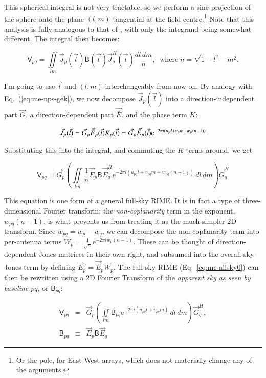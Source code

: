 \documentclass{aa}
\newcommand{\herm}{H}
\newcommand{\jones}[2]{\vec {#1}_{#2}}
\newcommand{\jonesT}[2]{\vec {#1}^{\herm}_{#2}}
\newcommand{\coh}[2]{\mathsf{{#1}}_{{#2}}}
\begin{document}
This spherical integral is not very tractable, so we perform a sine projection of the sphere onto the plane $(l,m)$ 
tangential at the field centre.\footnote{Or the pole, for East-West arrays, which does not materially change any of the arguments.} Note that this analysis is fully analogous to that of \citet[Sect.~3.1]{tms}, with only the integrand being somewhat different.  The integral then becomes:

\[
\coh{V}{pq} = \iint\limits_{lm} \jones{J}{p}(\vec l) \coh{B}{}(\vec l) \jonesT{J}{q}(\vec l) \frac{dl\,dm}{n},
\;\;\mathrm{where}\; n=\sqrt{1-l^2-m^2}.
\]

I'm going to use $\vec l$ and $(l,m)$ interchangeably from now on. By analogy with Eq.~(\ref{eq:me-nps-gek}), we now decompose $\jones{J}{p}(\vec l)$ into a direction-independent part $\jones{G}{}$, a direction-dependent part $\jones{\bar E}{}$, and the phase term $K$:

\[
\jones{J}{p}(\vec l) = \jones{G}{p}\jones{\bar E}{p}(\vec l) K_p(\vec l) = \jones{G}{p}\jones{\bar E}{p}(\vec l) {\rm e}^{-2\pi i(u_p l+v_p m+w_p (n-1))}
\]

Substituting this into the integral, and commuting the $K$ terms around, we get

\begin{equation}\label{eq:me-allsky0}
\coh{V}{pq} = \jones{G}{p} \left( \iint\limits_{lm} \frac{1}{n} \jones{\bar E}{p} \coh{B}{} \jonesT{\bar E}{q} \mathrm{e} ^{-2\pi i(u_{pq} l+v_{pq} m+w_{pq} (n-1))} \,dl\,dm \right) \jonesT{G}{q}
\end{equation}

This equation is one form of a general full-sky RIME. It is in fact a type of three-dimensional Fourier transform; the \emph{non-coplanarity} term in the exponent, $w_{pq}(n-1)$, is what prevents us from treating it as the much simpler 2D transform. Since $w_{pq}=w_p-w_q$, we can decompose the non-coplanarity term into per-antenna terms $W_p=\frac{1}{\sqrt{n}} \mathrm{e}^{-2\pi i w_p (n-1)}$. These can be thought of direction-dependent Jones matrices in their own right, and subsumed into the overall sky-Jones term by defining $\jones{E}{p} = \jones{\bar E}{p}W_p$. The full-sky RIME (Eq.~\ref{eq:me-allsky0}) can then be rewritten using a 2D Fourier Transform of the \emph{apparent sky as seen by baseline $pq$}, or $\coh{B}{pq}$:

\begin{eqnarray}\label{eq:me-allsky}
\coh{V}{pq} & = & \jones{G}{p} \left( \iint\limits_{lm} \coh{B}{pq} \mathrm{e} ^{-2\pi i(u_{pq} l+v_{pq} m)} \,dl\,dm \right) \jonesT{G}{q}, \\
\nonumber \coh{B}{pq} & \equiv & \jones{E}{p} \coh{B}{} \jones{E}{q}
\end{eqnarray}
\end{document}
